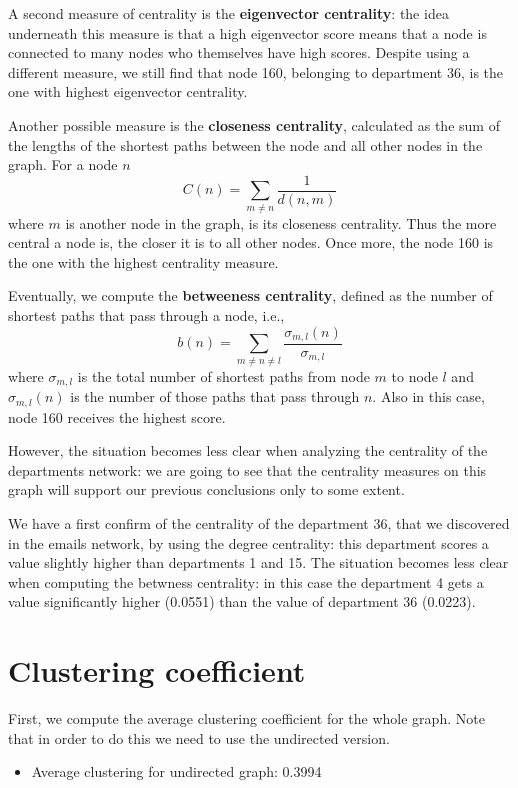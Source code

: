 \documentclass{report}
\theoremstyle{definition}
\theoremstyle{remark}
\begin{document}
A second measure of centrality is the \textbf{eigenvector centrality}: the idea underneath this measure is that a high eigenvector score means that a node is connected to many nodes who themselves have high scores. Despite using a different measure, we still find that node 160, belonging to department 36, is the one with highest eigenvector centrality.

Another possible measure is the \textbf{closeness centrality}, calculated as the sum of the lengths of the shortest paths between the node and all other nodes in the graph. For a node $n$ 
\begin{equation*}
C(n) = \sum_{m \neq n}\frac{1}{d(n,m)}
\end{equation*}
where $m$ is another node in the graph, is its closeness centrality.
Thus the more central a node is, the closer it is to all other nodes. Once more, the node 160 is the one with the highest centrality measure.

Eventually, we compute the \textbf{betweeness centrality}, defined as the number of shortest paths that pass through a node, i.e., 
\begin{equation*}
b(n) = \sum_{m \neq n\neq l} \frac{\sigma_{m,l}(n)}{\sigma_{m,l}}
\end{equation*}
where $\sigma _{m,l}$ is the total number of shortest paths from node $m$ to node $l$ and  $\sigma_{m,l}(n)$ is the number of those paths that pass through $n$. Also in this case, node 160 receives the highest score.

However, the situation becomes less clear when analyzing the centrality of the departments network: we are going to see that the centrality measures on this graph will support our previous conclusions only to some extent.

We have a first confirm of the centrality of the department 36, that we discovered in the emails network, by using the degree centrality: this department scores a value slightly higher than departments 1 and 15. The situation becomes less clear when computing the betwness centrality: in this case the department 4 gets a value significantly higher (0.0551) than the value of department 36 (0.0223).
\section*{Clustering coefficient}
First, we compute the average clustering coefficient for the whole graph. Note that in order to do this we need to use the undirected version.
\begin{itemize}
	\item Average clustering for undirected graph: 0.3994
\end{itemize}
\end{document}
